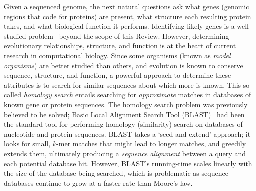 \documentclass{acm_proc_article-sp}
\begin{document}
Given a sequenced genome, the next natural questions ask what genes (genomic
regions that code for proteins) are present, what structure each resulting
protein takes, and what biological function it performs.
Identifying likely genes is a well-studied problem~\cite{berger2013computational} 
beyond the scope of this Review.
However, determining evolutionary relationships, structure, and function is
at the heart of current research in computational biology.
Since some organisms (known as \emph{model organisms}) are better studied than
others, and evolution is known to conserve sequence, structure, and function,
a powerful approach to determine these attributes is to search for similar
sequences about which more is known. 
This so-called \emph{homology search} entails searching for \emph{approximate}
matches in databases of known gene or protein sequences.
The homology search problem was previously believed to be solved;
Basic Local Alignment Search Tool (BLAST)~\cite{berger2013computational} had been
the standard tool for performing homology (similarity) search on databases of nucleotide and
protein sequences.
BLAST takes a `seed-and-extend' approach; it looks for small, $k$-mer matches
that might lead to longer matches, and greedily extends them, ultimately 
producing a \emph{sequence alignment} between a query and each potential 
database hit.
However, BLAST's running-time scales linearly with the size of the database being
searched, which is problematic as sequence databases continue to grow at a
faster rate than Moore's law.
\end{document}
